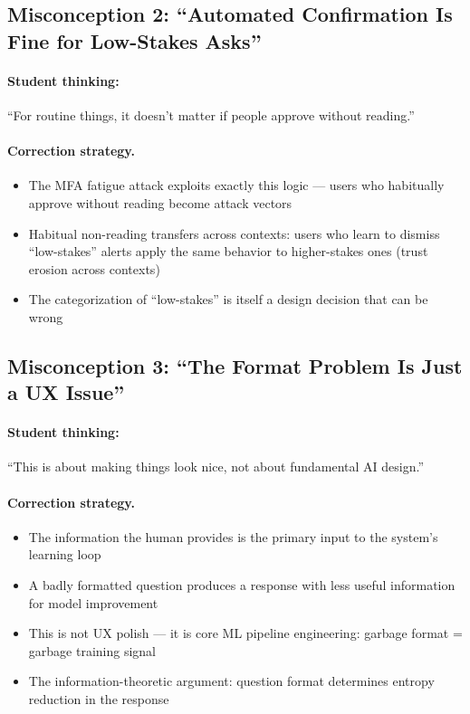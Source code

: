 \subsection{Misconception 2: ``Automated Confirmation Is Fine for Low-Stakes Asks''}

\paragraph{Student thinking:} ``For routine things, it doesn't matter if people approve without reading.''

\paragraph{Correction strategy.}
\begin{itemize}
    \item The MFA fatigue attack exploits exactly this logic --- users who habitually approve without reading become attack vectors
    \item Habitual non-reading transfers across contexts: users who learn to dismiss ``low-stakes'' alerts apply the same behavior to higher-stakes ones (trust erosion across contexts)
    \item The categorization of ``low-stakes'' is itself a design decision that can be wrong
\end{itemize}

\subsection{Misconception 3: ``The Format Problem Is Just a UX Issue''}

\paragraph{Student thinking:} ``This is about making things look nice, not about fundamental AI design.''

\paragraph{Correction strategy.}
\begin{itemize}
    \item The information the human provides is the primary input to the system's learning loop
    \item A badly formatted question produces a response with less useful information for model improvement
    \item This is not UX polish --- it is core ML pipeline engineering: garbage format = garbage training signal
    \item The information-theoretic argument: question format determines entropy reduction in the response
\end{itemize}

